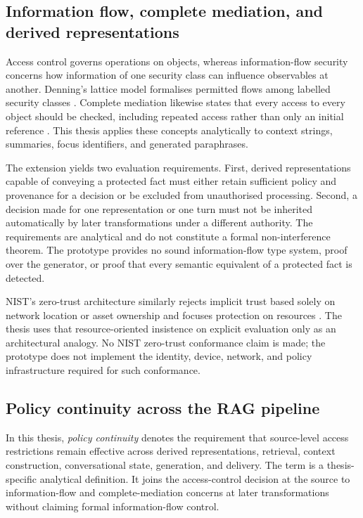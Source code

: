 \subsection{Information flow, complete mediation, and derived representations}

Access control governs operations on objects, whereas information-flow security concerns how information of one security class can influence observables at another. Denning's lattice model formalises permitted flows among labelled security classes \citep{denning1976lattice}. Complete mediation likewise states that every access to every object should be checked, including repeated access rather than only an initial reference \citep{saltzer1975protection}. This thesis applies these concepts analytically to context strings, summaries, focus identifiers, and generated paraphrases.

The extension yields two evaluation requirements. First, derived representations capable of conveying a protected fact must either retain sufficient policy and provenance for a decision or be excluded from unauthorised processing. Second, a decision made for one representation or one turn must not be inherited automatically by later transformations under a different authority. The requirements are analytical and do not constitute a formal non-interference theorem. The prototype provides no sound information-flow type system, proof over the generator, or proof that every semantic equivalent of a protected fact is detected.

NIST's zero-trust architecture similarly rejects implicit trust based solely on network location or asset ownership and focuses protection on resources \citep{rose2020zerotrust}. The thesis uses that resource-oriented insistence on explicit evaluation only as an architectural analogy. No NIST zero-trust conformance claim is made; the prototype does not implement the identity, device, network, and policy infrastructure required for such conformance.

\subsection{Policy continuity across the RAG pipeline}

In this thesis, \emph{policy continuity} denotes the requirement that source-level access restrictions remain effective across derived representations, retrieval, context construction, conversational state, generation, and delivery. The term is a thesis-specific analytical definition. It joins the access-control decision at the source to information-flow and complete-mediation concerns at later transformations without claiming formal information-flow control.

